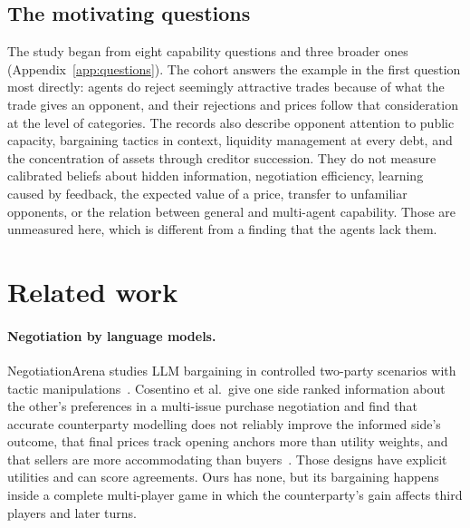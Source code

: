 \subsection{The motivating questions}

The study began from eight capability questions and three broader ones (Appendix~\ref{app:questions}). The cohort answers the example in the first question most directly: agents do reject seemingly attractive trades because of what the trade gives an opponent, and their rejections and prices follow that consideration at the level of categories. The records also describe opponent attention to public capacity, bargaining tactics in context, liquidity management at every debt, and the concentration of assets through creditor succession. They do not measure calibrated beliefs about hidden information, negotiation efficiency, learning caused by feedback, the expected value of a price, transfer to unfamiliar opponents, or the relation between general and multi-agent capability. Those are unmeasured here, which is different from a finding that the agents lack them.

\section{Related work}
\label{sec:related}

\paragraph{Negotiation by language models.} NegotiationArena studies LLM bargaining in controlled two-party scenarios with tactic manipulations~\cite{bianchi2024negotiationarena}. Cosentino et al.\ give one side ranked information about the other's preferences in a multi-issue purchase negotiation and find that accurate counterparty modelling does not reliably improve the informed side's outcome, that final prices track opening anchors more than utility weights, and that sellers are more accommodating than buyers~\cite{cosentino2026counterparty}. Those designs have explicit utilities and can score agreements. Ours has none, but its bargaining happens inside a complete multi-player game in which the counterparty's gain affects third players and later turns.

